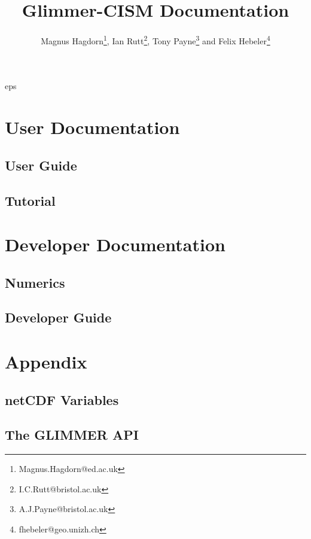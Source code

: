 
\frontmatter
\title{Glimmer-CISM {\glimmerver} Documentation}
\author{Magnus Hagdorn\thanks{Magnus.Hagdorn@ed.ac.uk}, Ian
  Rutt\thanks{I.C.Rutt@bristol.ac.uk}, Tony Payne\thanks{A.J.Payne@bristol.ac.uk} 
  and Felix Hebeler\thanks{fhebeler@geo.unizh.ch}}
\maketitle
\tableofcontents

{
         {eps} 
         {%
         } 

}
{}

\mainmatter
\part{User Documentation}
\chapter{User Guide}
\newcommand{\dir}{ug}


\chapter{Tutorial}
\renewcommand{\dir}{tut}


\part{Developer Documentation}

\chapter{Numerics}
\renewcommand{\dir}{num}


\chapter{Developer Guide}
\renewcommand{\dir}{dg}


\renewcommand{\dir}{ext}


\part{Appendix}
\appendix
\renewcommand{\dir}{ug}
\chapter{netCDF Variables}

\chapter{The GLIMMER API}





